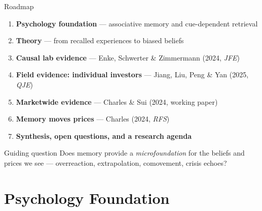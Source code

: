 \documentclass[aspectratio=169, 11pt]{beamer}
\begin{document}
\begin{frame}{Roadmap}
\begin{enumerate}
\item \textbf{Psychology foundation} --- associative memory and cue-dependent retrieval
\item \textbf{Theory} --- from recalled experiences to biased beliefs
\item \textbf{Causal lab evidence} --- Enke, Schwerter \& Zimmermann (2024, \textit{JFE})
\item \textbf{Field evidence: individual investors} --- Jiang, Liu, Peng \& Yan (2025, \textit{QJE})
\item \textbf{Marketwide evidence} --- Charles \& Sui (2024, working paper)
\item \textbf{Memory moves prices} --- Charles (2024, \textit{RFS})
\item \textbf{Synthesis, open questions, and a research agenda}
\end{enumerate}
\vfill
\begin{alertblock}{Guiding question}
Does memory provide a \emph{microfoundation} for the beliefs and prices we see --- overreaction, extrapolation, comovement, crisis echoes?
\end{alertblock}
\end{frame}

\section{Psychology Foundation}
\end{document}
